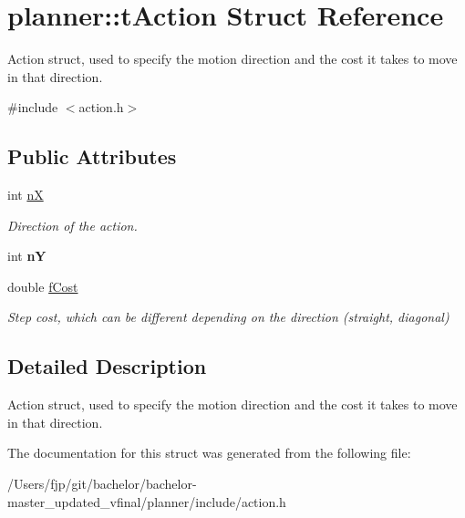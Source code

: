 \hypertarget{structplanner_1_1t_action}{}\section{planner\+:\+:t\+Action Struct Reference}
\label{structplanner_1_1t_action}


Action struct, used to specify the motion direction and the cost it takes to move in that direction.  




{\ttfamily \#include $<$action.\+h$>$}

\subsection*{Public Attributes}
\begin{DoxyCompactItemize}
\item 
\mbox{\label{structplanner_1_1t_action_a6cf36892b4601d7d267d1a9d2e9d6595}} 
int \mbox{\hyperlink{structplanner_1_1t_action_a6cf36892b4601d7d267d1a9d2e9d6595}{nX}}
\begin{DoxyCompactList}\small\item\em Direction of the action. \end{DoxyCompactList}\item 
\mbox{\label{structplanner_1_1t_action_a382637fed2bbf09a18d5f42201704314}} 
int {\bfseries nY}
\item 
\mbox{\label{structplanner_1_1t_action_a7bac43507f0daab4fb5850c66e1da9d2}} 
double \mbox{\hyperlink{structplanner_1_1t_action_a7bac43507f0daab4fb5850c66e1da9d2}{f\+Cost}}
\begin{DoxyCompactList}\small\item\em Step cost, which can be different depending on the direction (straight, diagonal) \end{DoxyCompactList}\end{DoxyCompactItemize}


\subsection{Detailed Description}
Action struct, used to specify the motion direction and the cost it takes to move in that direction. 

The documentation for this struct was generated from the following file\+:\begin{DoxyCompactItemize}
\item 
/\+Users/fjp/git/bachelor/bachelor-\/master\+\_\+updated\+\_\+vfinal/planner/include/action.\+h\end{DoxyCompactItemize}
